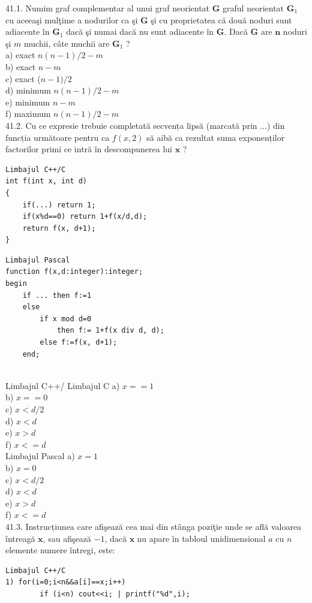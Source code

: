 \begin{itemize}
\begin{enumerate}
41.1. Numim graf complementar al unui graf neorientat $\mathbf{G}$ graful neorientat $\mathbf{G}_{1}$ cu aceeaşi mulţime a nodurilor ca şi $\mathbf{G}$ şi cu proprietatea că două noduri sunt adiacente în $\mathbf{G}_{1}$ dacă şi numai dacă nu sunt adiacente în $\mathbf{G}$. Dacă $\mathbf{G}$ are $\mathbf{n}$ noduri şi $m$ muchii, câte muchii are $\mathbf{G}_{1}$ ?
\\
a) exact $n(n-1)/2-m$
\\
b) exact $n-m$
\\
c) exact ($n-1)/2$
\\
d) minimum $n(n-1)/2-m$
\\
e) minimum $n-m$
\\
f) maximum $n(n-1)/2-m$
\\
41.2. Cu ce expresie trebuie completată secvența lipsă (marcată prin ...) din funcția următoare pentru ca $f(x,2)$ să aibă ca rezultat suma exponenților factorilor primi ce intră în descompunerea lui $\mathbf{x}$ ?
\begin{verbatim}
Limbajul C++/C
int f(int x, int d)
{
    if(...) return 1;
    if(x%d==0) return 1+f(x/d,d);
    return f(x, d+1);
}
\end{verbatim}
\begin{verbatim}
Limbajul Pascal
function f(x,d:integer):integer;
begin
    if ... then f:=1
    else
        if x mod d=0
            then f:= 1+f(x div d, d);
        else f:=f(x, d+1);
    end;
\end{verbatim}
\\
Limbajul C++/ Limbajul C
a) $x==1$
\\
b) $x==0$
\\
c) $x<d/2$
\\
d) $x<d$
\\
e) $x>d$
\\
f) $x<=d$
\\
Limbajul Pascal
a) $x=1$
\\
b) $x=0$
\\
c) $x<d/2$
\\
d) $x<d$
\\
e) $x>d$
\\
f) $x<=d$
\\
41.3. Instrucțiunea care afişează cea mai din stânga poziţie unde se află valoarea întreagă $\mathbf{x}$, sau afişează $-1$, dacă $\mathbf{x}$ nu apare în tabloul unidimensional $a$ cu $n$ elemente numere întregi, este:
\begin{verbatim}
Limbajul C++/C
1) for(i=0;i<n&&a[i]==x;i++)
        if (i<n) cout<<i; | printf("%d",i);

\end{verbatim}
\end{enumerate}
\end{itemize}
